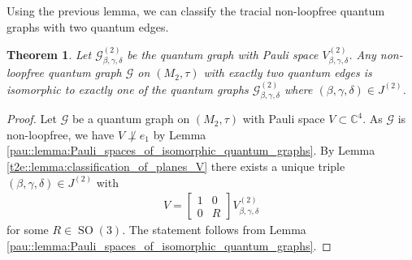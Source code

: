 \documentclass{amsart}
\newtheorem{thm}{Theorem}[section]
\newcommand{\C}{\mathbb{C}}
\DeclareMathOperator{\SO}{SO}
\DeclareMathOperator{\spann}{span}
\begin{document}
Using the previous lemma, we can classify the tracial non-loopfree quantum graphs with two quantum edges.


\begin{thm}
    \label{t2e::thm:classification_of_t2e_qgraphs}
    Let $\mathcal{G}_{\beta,\gamma,\delta}^{(2)}$ be the quantum graph with Pauli space $V_{\beta,\gamma,\delta}^{(2)}$.
    Any non-loopfree quantum graph $\mathcal{G}$ on $(M_2,\tau)$ with exactly two quantum edges is isomorphic to exactly one of the quantum graphs $\mathcal{G}_{\beta,\gamma,\delta}^{(2)}$ where $(\beta,\gamma,\delta)\in J^{(2)}$.
\end{thm}

\begin{proof}
    Let $\mathcal{G}$ be a quantum graph on $(M_2, \tau)$ with Pauli space $V \subset \C^4$. As $\mathcal{G}$ is non-loopfree, we have  $V \not \perp e_1$  by Lemma \ref{pau::lemma:Pauli_spaces_of_isomorphic_quantum_graphs}. By Lemma \ref{t2e::lemma:classification_of_planes_V} there exists a unique triple $(\beta, \gamma, \delta) \in J^{(2)}$ with
    \begin{align*}
        V = \left[\begin{array}{c|c}
            1& 0 \\
            \hline
            0 & R 
            \end{array}\right] 
            V_{\beta, \gamma, \delta}^{(2)}
    \end{align*}
    for some $R \in \SO(3)$. The statement follows from Lemma \ref{pau::lemma:Pauli_spaces_of_isomorphic_quantum_graphs}.
\end{proof}
\end{document}
